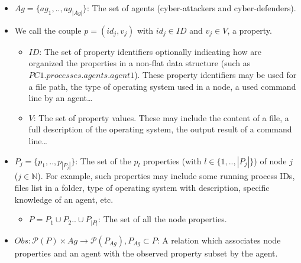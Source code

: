\begin{itemize}

    \item $Ag = \{ag_1,..,ag_{|Ag|}\}$: The set of agents (cyber-attackers and cyber-defenders).

    \item We call the couple $p = (id_{j}, v_{j})$ with $id_j \in {ID}$ and $v_j \in V$, a property.
    \begin{itemize}
        \item $ID$: The set of property identifiers optionally indicating how are organized the properties in a non-flat data structure (such as $PC1.processes.agents.agent1$). These property identifiers may be used for a file path, the type of operating system used in a node, a used command line by an agent\dots
        \item $V$: The set of property values. These may include the content of a file, a full description of the operating system, the output result of a command line\dots
    \end{itemize}

    \item $P_{j} = \{ p_1, .., p_{|P_{j}|} \}$: The set of the $p_{l}$ properties (with $l \in \{1,..,|P_{j}|\}$) of node $j$ ($j \in \mathbb{N} $). For example, such properties may include some running process IDs, files list in a folder, type of operating system with description, specific knowledge of an agent, etc.
    \begin{itemize}
        \item $P = P_1 \cup P_2 .. \cup P_{|P|} $: The set of all the node properties.
    \end{itemize}

    \item $Obs: \mathcal{P}(P) \times Ag \rightarrow \mathcal{P}(P_{Ag}), P_{Ag} \subset P$: A relation which associates node properties and an agent with the observed property subset by the agent.
    

\end{itemize}
